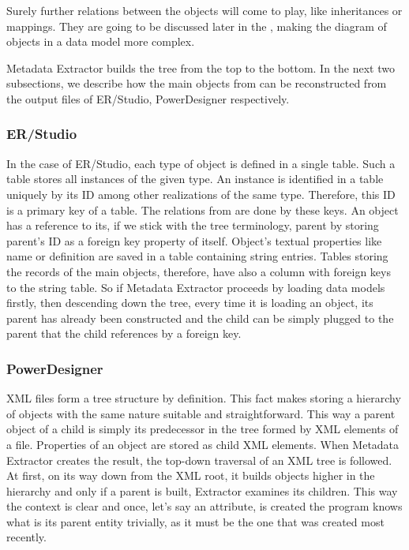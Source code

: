 Surely further relations between the objects will come to play, like inheritances or mappings. They are going to be discussed later in the , making the diagram of objects in a data model more complex.

Metadata Extractor builds the tree from the top to the bottom. 
In the next two subsections, we describe how the main objects from  can be reconstructed from the output files of ER/Studio, PowerDesigner respectively.

\subsubsection{ER/Studio}

In the case of ER/Studio, each type of object is defined in a single table. Such a table stores all instances of the given type. 
An instance is identified in a table uniquely by its ID among other realizations of the same type.
Therefore, this ID is a primary key of a table. The relations from  are 
done by these keys.
An object has a reference to its, if we stick with the tree terminology, parent by storing parent's ID as a foreign key property of itself. 
Object's textual properties like name or definition are saved in a table containing string entries. 
Tables storing the records of the main objects, therefore, have also a column with foreign keys to the string table. 
So if Metadata Extractor proceeds by loading data models firstly, then descending down the tree, every time it is loading an object, its parent has already been constructed and the child can be simply plugged to the parent that the child references by a foreign key.

\subsubsection{PowerDesigner}

XML files form a tree structure by definition. This fact makes storing a hierarchy of objects with the same nature suitable and straightforward. 
This way a parent object of a child is simply its predecessor in the tree formed by XML elements of a file. 
Properties of an object are stored as child XML elements.
When Metadata Extractor creates the result, the top-down traversal of an XML tree is followed. 
At first, on its way down from the XML root, it builds objects higher in the hierarchy and only if a parent is built, Extractor examines its children. 
This way the context is clear and once, let's say an attribute, is created the program knows what is its parent entity trivially, as it must be the one that was created most recently.

